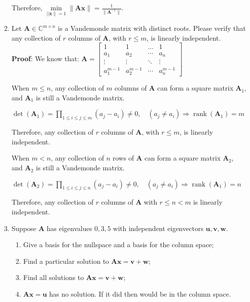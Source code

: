 \documentclass[12pt, a4paper, UTF8]{ctexart}
\begin{document}
\begin{enumerate}
		Therefore, $\mathop{min}\limits_{||\bm{x}\|=1}\|\bm{Ax}\|=\frac{1}{\|\bm{A}^{-1}\|}.$
		
		\item
		Let $\bm{A}\in\mathbb{C}^{m\times n}$ is a Vandemonde matrix with distinct roots. 
		Please verify that any collection of $r$ columns of $\bm{A}$, with $r\leq m$, is linearly independent.
		\\\textbf{Proof}:
		We know that: $\bm{A}= 
		\left[\begin{matrix} 
			1 & 1 & \dots & 1 \\ 
			a_1 & a_2 & \cdots & a_n \\ 
			\vdots & \vdots & \ddots & \vdots \\ 
			a_1^{m-1} & a_2^{m-1} & \cdots & a_n^{m-1}
		\end{matrix} \right]$

		When $m \leq n$, any collection of $m$ columns of $\bm{A}$ can form a square matrix $\bm{A}_1$, and $\bm{A}_1$ is still a Vandemonde matrix.
		
		$\mathop{det}(\bm{A}_1)=\prod\limits_{1\leq i\leq j\leq m}(a_j-a_i) \neq 0, \quad (a_j \neq a_i)  \Longrightarrow \mathop{rank}(\bm{A}_1)=m$
		
		Therefore, any collection of $r$ columns of $\bm{A}$, with $r\leq m$, is linearly independent.
		
		When $m < n$, any collection of $n$ rows of $\bm{A}$ can form a square matrix $\bm{A}_2$, and $\bm{A}_2$ is still a Vandemonde matrix.

		$\mathop{det}(\bm{A}_2)=\prod\limits_{1\leq i\leq j\leq n}(a_j-a_i)\neq 0, \quad (a_j\neq a_i) \Longrightarrow \mathop{rank}(\bm{A}_1)=n$
		
		Therefore, any collection of $r$ columns of $\bm{A}$ with $r\leq n < m$ is linearly independent.

		\item%
		Suppose $\bm{A}$ has eigenvalues $0,3,5$ with independent eigenvectors $\bm{u}, \bm{v}, \bm{w}$.
		\begin{enumerate}
			\item Give a basis for the nullspace and a basis for the column space;
			\item Find a particular solution to $\bm{Ax}=\bm{v}+\bm{w}$;
			\item Find all solutions to $\bm{Ax}=\bm{v}+\bm{w}$;
			\item $\bm{Ax}=\bm{u}$ has no solution. If it did then \underline{\makebox[3em]{}} would be in the column space.
		\end{enumerate}


\end{enumerate}
\end{document}
